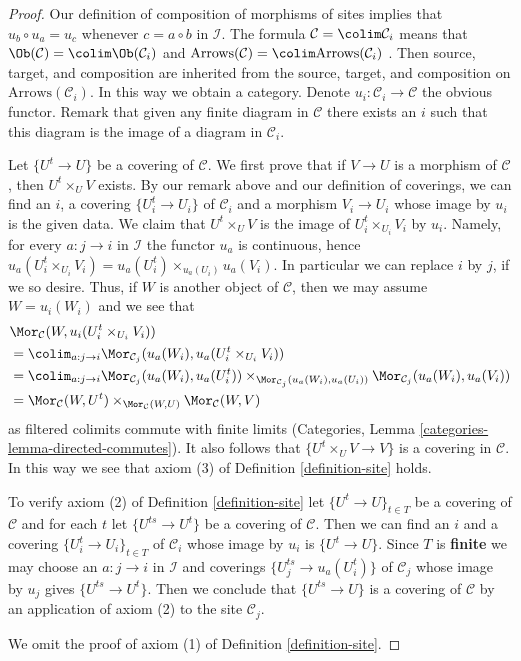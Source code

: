 \begin{proof}
Our definition of composition of morphisms of sites implies that
$u_b \circ u_a = u_c$ whenever $c = a \circ b$ in $\mathcal{I}$.
The formula $\mathcal{C} = \colim \mathcal{C}_i$ means that
$\Ob(\mathcal{C}) = \colim \Ob(\mathcal{C}_i)$ and
$\text{Arrows}(\mathcal{C}) = \colim \text{Arrows}(\mathcal{C}_i)$ .
Then source, target, and composition are inherited from the
source, target, and composition on $\text{Arrows}(\mathcal{C}_i)$.
In this way we obtain a category. 
Denote $u_i : \mathcal{C}_i \to \mathcal{C}$ the obvious functor.
Remark that given any finite diagram in $\mathcal{C}$
there exists an $i$ such that this diagram is
the image of a diagram in $\mathcal{C}_i$.

\medskip\noindent
Let $\{U^t \to U\}$ be a covering of $\mathcal{C}$. We first prove that if
$V \to U$ is a morphism of $\mathcal{C}$, then $U^t \times_U V$ exists.
By our remark above and our definition of coverings, we can find an
$i$, a covering $\{U_i^t \to U_i\}$ of $\mathcal{C}_i$ and a morphism
$V_i \to U_i$ whose image by $u_i$ is the given data. We claim that
$U^t \times_U V$ is the image of $U^t_i \times_{U_i} V_i$ by $u_i$.
Namely, for every $a : j \to i$ in $\mathcal{I}$ the functor $u_a$
is continuous, hence
$u_a(U^t_i \times_{U_i} V_i) = u_a(U^t_i) \times_{u_a(U_i)} u_a(V_i)$.
In particular we can replace $i$ by $j$, if we so desire.
Thus, if $W$ is another object of $\mathcal{C}$, then we may
assume $W = u_i(W_i)$ and we see that
\begin{align*}
& \Mor_\mathcal{C}(W, u_i(U^t_i \times_{U_i} V_i)) \\
& =
\colim_{a : j \to i}
\Mor_{\mathcal{C}_j}(u_a(W_i), u_a(U^t_i \times_{U_i} V_i)) \\
& =
\colim_{a : j \to i}
\Mor_{\mathcal{C}_j}(u_a(W_i), u_a(U^t_i))
\times_{\Mor_{\mathcal{C}_j}(u_a(W_i), u_a(U_i))}
\Mor_{\mathcal{C}_j}(u_a(W_i), u_a(V_i)) \\
& =
\Mor_\mathcal{C}(W, U^t)
\times_{\Mor_\mathcal{C}(W, U)}
\Mor_\mathcal{C}(W, V)
\end{align*}
as filtered colimits commute with finite limits
(Categories, Lemma \ref{categories-lemma-directed-commutes}).
It also follows that
$\{U^t \times_U V \to V\}$ is a covering in $\mathcal{C}$.
In this way we see that axiom (3) of Definition \ref{definition-site} holds.

\medskip\noindent
To verify axiom (2) of Definition \ref{definition-site}
let $\{U^t \to U\}_{t \in T}$ be a covering of $\mathcal{C}$
and for each $t$ let $\{U^{ts} \to U^t\}$ be a covering of
$\mathcal{C}$. Then we can find an $i$ and a covering
$\{U^t_i \to U_i\}_{t \in T}$ of $\mathcal{C}_i$ whose image by $u_i$ is
$\{U^t \to U\}$. Since $T$ is {\bf finite} we may choose an $a : j \to i$
in $\mathcal{I}$ and coverings $\{U^{ts}_j \to u_a(U^t_i)\}$ of
$\mathcal{C}_j$ whose image by $u_j$ gives $\{U^{ts} \to U^t\}$.
Then we conclude that $\{U^{ts} \to U\}$ is a covering of $\mathcal{C}$
by an application of axiom (2) to the site $\mathcal{C}_j$.

\medskip\noindent
We omit the proof of axiom (1) of Definition \ref{definition-site}.
\end{proof}


